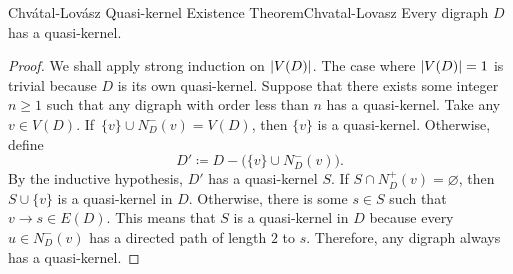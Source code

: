 \documentclass[math]{amznotes}
\theoremstyle{remark}
\newcommand{\0}{\mathbf{0}}
\newcommand{\1}{\mathbf{1}}
\begin{document}
\begin{thmbox}{Chv\'{a}tal-Lov\'{a}sz Quasi-kernel Existence Theorem}{Chvatal-Lovasz}
    Every digraph $D$ has a quasi-kernel.
    \tcblower
    \begin{proof}
        We shall apply strong induction on ${\left\lvert {V(D)} \right\rvert}$. The case where ${\left\lvert {V(D)} \right\rvert} = 1$ is trivial because $D$ is its own quasi-kernel. Suppose that there exists some integer $n \geq 1$ such that any digraph with order less than $n$ has a quasi-kernel. Take any $v \in V(D)$. If~$\{v\} \cup N_D^-(v) = V(D)$, then $\{v\}$ is a quasi-kernel. Otherwise, define 
        \begin{equation*}
            D' \coloneqq D - \bigl(\{v\} \cup N_D^-(v)\bigr).
        \end{equation*}
        By the inductive hypothesis, $D'$ has a quasi-kernel $S$. If $S \cap N_D^+(v) = \varnothing$, then $S \cup \{v\}$ is a quasi-kernel in $D$. Otherwise, there is some $s \in S$ such that $v \to s \in E(D)$. This means that $S$ is a quasi-kernel in $D$ because every $u \in N_D^-(v)$ has a directed path of length $2$ to $s$. Therefore, any digraph always has a quasi-kernel.
    \end{proof}
\end{thmbox}
\end{document}
